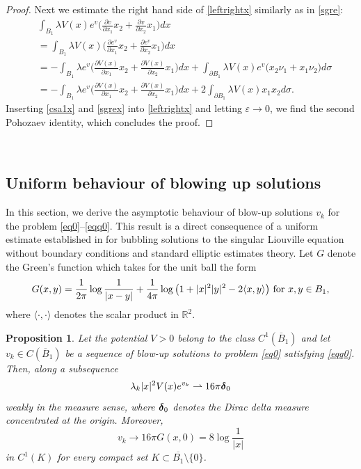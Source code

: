 \documentclass[reqno,11pt]{amsart}
\def\bbm[#1]{\mbox{\boldmath $#1$}}
\newtheorem{prop}[thm]{Proposition}
\theoremstyle{definition}
\numberwithin{equation}{section}
\newcommand{\R}{\mathbb{R}}
\newcommand{\de}{\delta}
\newcommand{\la}{\lambda}
\newcommand{\e}{\varepsilon}
\renewcommand{\(}{\left(}
\renewcommand{\)}{\right)}
\renewcommand{\[}{\left[}
\renewcommand{\]}{\right]}
\newcommand{\beq}{\begin{equation}}
\newcommand{\eeq}{\end{equation}}
\def\bbm[#1]{\mbox{\boldmath $#1$}}
\begin{document}
{\begin{proof}
Next we estimate the right hand side of \eqref{leftrightx} similarly as in \eqref{sgre}: \beq\label{sgrex}\begin{aligned}&\int_{B_1} \la  V(x) e^{v}\bigg(\frac{\partial v}{\partial x_1}x_2+\frac{\partial v}{\partial x_2}x_1\bigg)  dx
\\&=\int_{B_1} \la V(x) \bigg(\frac{\partial e^v}{\partial x_1}x_2+\frac{\partial e^v}{\partial x_2}x_1\bigg)dx\\ &=
-\int_{B_1} \la e^{v}\bigg(\frac{\partial V(x)}{\partial x_1}x_2+\frac{\partial V(x)}{\partial x_2}x_1\bigg) dx
+\int_{\partial B_1}\la  V(x)e^v \Big(x_2\nu_1+x_1\nu_2\Big)d\sigma
\\ &=
-\int_{B_1} \la e^{v}\bigg(\frac{\partial V(x)}{\partial x_1}x_2+\frac{\partial V(x)}{\partial x_2}x_1\bigg) dx
+2\int_{\partial B_1}\la  V(x) x_1x_2d\sigma.
\end{aligned}\eeq 
Inserting \eqref{csa1x} and \eqref{sgrex} into \eqref{leftrightx} and letting $\e\to 0$, we find the second Pohozaev identity, which concludes the proof. \end{proof}

\

\subsection{{\large{Uniform behaviour of blowing up solutions}}}
In this section, we derive the asymptotic behaviour of blow-up solutions $v_k$ for the problem \eqref{eq0}--\eqref{eqq0}. This result  is a direct consequence of a uniform estimate established in \cite{bara2}  for bubbling solutions to the singular Liouville equation without boundary conditions and standard elliptic estimates theory.
Let $G$ denote the Green's function which  takes for the unit ball the form $$G(x,y)=\frac{1}{2\pi}\log\frac{1}{|x-y|}+\frac{1}{4\pi}\log\big(1+|x|^2|y|^2-2 \langle x,y\rangle \big)\hbox{ for }x,y\in B_1,$$  where $\langle\cdot,\cdot\rangle$ denotes the scalar product in $\R^2$.  

\begin{prop}\label{lililili} Let  the potential $V > 0$ belong to the class $C^1(\overline{B}_1)$ and let  $v_k\in C(\overline{B}_1)$ be a sequence of blow-up solutions  to problem  \eqref{eq0} satisfying \eqref{eqq0}. Then, 
along a subsequence
\beq\label{cuccu}\la_k|x|^2V(x)e^{v_k}\rightharpoonup 16\pi  {\bbm[\de]}_0\eeq
weakly in the measure sense, where ${\bbm[\de]}_0$ denotes the Dirac delta measure concentrated at the origin. Moreover,  
$$
v_k\longrightarrow 16\pi G(x,0)=8\log\frac{1}{|x|}
$$
in $C^1(K)$ for every compact set $K \subset \overline{B_1}\setminus\{0\}$.
\end{prop}

}
\end{document}
